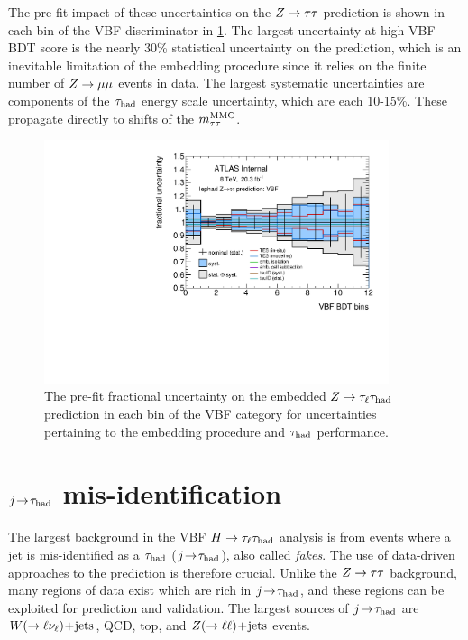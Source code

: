 The pre-fit impact of these uncertainties on the $Z\rightarrow\tau\tau$ prediction is shown in each bin of the VBF discriminator in \cref{fig:backgrounds-uncertainties-Ztautau}. The largest uncertainty at high VBF BDT score is the nearly 30\% statistical uncertainty on the prediction, which is an inevitable limitation of the embedding procedure since it relies on the finite number of $Z \rightarrow \mu\mu$ events in data. The largest systematic uncertainties are components of the $\tau_\text{had}$ energy scale uncertainty, which are each 10-15\%. These propagate directly to shifts of the $m_{\tau\tau}^\text{MMC}$.

\begin{figure}[tp]
  \includegraphics[width=0.90\textwidth]{figures/uncertainties/uncertainties_lephad_paper14_8TeV_Ztautau_VBF}
  \caption{The pre-fit fractional uncertainty on the embedded $Z\rightarrow\tau_\ell\tau_\text{had}$ prediction in each bin of the VBF category for uncertainties pertaining to the embedding procedure and $\tau_\text{had}$ performance.}
  \label{fig:backgrounds-uncertainties-Ztautau}
\end{figure}

\section{$j\!\rightarrow\!\tau_\text{had}$ mis-identification}
\label{sec:backgrounds-misid}

The largest background in the VBF $H\rightarrow\tau_\ell\tau_\text{had}$ analysis is from events where a jet is mis-identified as a $\tau_\text{had}$ ($j\!\rightarrow\!\tau_\text{had}$), also called \textit{fakes}. The use of data-driven approaches to the prediction is therefore crucial. Unlike the $Z\rightarrow\tau\tau$ background, many regions of data exist which are rich in $j\!\rightarrow\!\tau_\text{had}$, and these regions can be exploited for prediction and validation. The largest sources of $j\!\rightarrow\!\tau_\text{had}$ are $W (\rightarrow \ell\nu_\ell)\!+\!\text{jets}$, QCD, top, and $Z (\rightarrow \ell\ell)\!+\!\text{jets}$ events.

